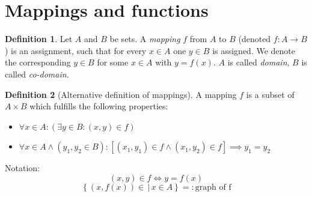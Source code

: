 \documentclass[a4paper,landscape,twocolumn]{article}
\theoremstyle{definition}
\newtheorem{defi}{Definition}
\newcommand\setdef[2]{\left\{#1\,|\,#2\right\}}
\begin{document}
\section{Mappings and functions}
\begin{defi}
  Let $A$ and $B$ be sets.
  A \emph{mapping} $f$ from $A$ to $B$ (denoted $f: A \rightarrow B$) is an assignment,
  such that for every $x \in A$ one $y \in B$ is assigned. We denote the corresponding
  $y \in B$ for some $x \in A$ with $y = f(x)$.
  $A$ is called \emph{domain}, $B$ is called \emph{co-domain}.
\end{defi}

\begin{defi}[Alternative definition of mappings]
  A mapping $f$ is a subset of $A \times B$ which fulfills the following properties:
  \begin{itemize}
    \item $\forall x \in A: \left(\exists y \in B: (x, y) \in f\right)$
    \item $\forall x \in A \land (y_1, y_2 \in B): \left[(x_1,y_1) \in f \land (x_1, y_2) \in f\right] \implies y_1 = y_2$
  \end{itemize}
  Notation:
  \[ (x, y) \in f \Leftrightarrow y = f(x) \]
  \[ \setdef{(x, f(x)) \in}{x \in A} =: \text{graph of f} \]
\end{defi}
\end{document}
